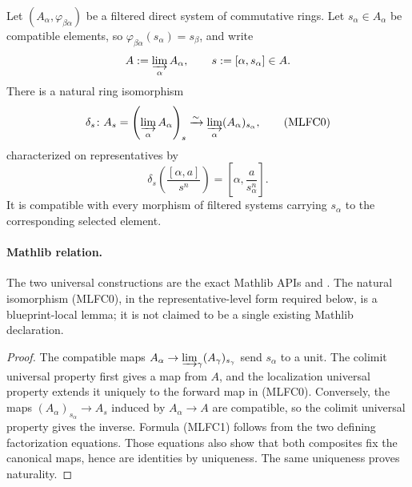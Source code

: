 \begin{lemma}
  \label{lemma:nagata-localization-filtered-colimit}
  \lean{}

  Let $(A_\alpha,\varphi_{\beta\alpha})$ be a filtered direct system of
  commutative rings.  Let $s_\alpha\in A_\alpha$ be compatible elements,
  so $\varphi_{\beta\alpha}(s_\alpha)=s_\beta$, and write
  \[
    A:=\varinjlim_\alpha A_\alpha,
    \qquad s:=[\alpha,s_\alpha]\in A.
  \]
  There is a natural ring isomorphism
  \[
    \delta_s\colon
      A_s=\left(\varinjlim_\alpha A_\alpha\right)_s
        \xrightarrow{\sim}
      \varinjlim_\alpha(A_\alpha)_{s_\alpha},                   \tag{MLFC0}
  \]
  characterized on representatives by
  \[
    \delta_s\!\left(\frac{[\alpha,a]}{s^n}\right)
      =\left[\alpha,\frac{a}{s_\alpha^n}\right].                \tag{MLFC1}
  \]
  It is compatible with every morphism of filtered systems carrying
  $s_\alpha$ to the corresponding selected element.

  \paragraph{Mathlib relation.}
  The two universal constructions are the exact Mathlib APIs
  \texttt{} and
  \texttt{}.  The natural isomorphism
  (MLFC0), in the representative-level form required below, is a
  blueprint-local lemma; it is not claimed to be a single existing Mathlib
  declaration.
\end{lemma}

\begin{proof}
  The compatible maps
  $A_\alpha\to\varinjlim_\gamma(A_\gamma)_{s_\gamma}$ send
  $s_\alpha$ to a unit.  The colimit universal property first gives a map
  from $A$, and the localization universal property extends it uniquely to
  the forward map in (MLFC0).  Conversely, the maps
  $(A_\alpha)_{s_\alpha}\to A_s$ induced by $A_\alpha\to A$ are compatible,
  so the colimit universal property gives the inverse.  Formula (MLFC1)
  follows from the two defining factorization equations.  Those equations
  also show that both composites fix the canonical maps, hence are
  identities by uniqueness.  The same uniqueness proves naturality.
\end{proof}

